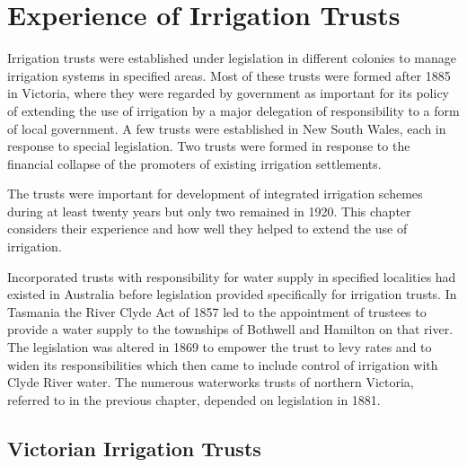 
\chapter{Experience of Irrigation Trusts}

\label{ch:trusts}

\setcounter{endnote}{0}

Irrigation trusts were established under legislation in different
colonies to manage irrigation systems in specified areas. Most of
these trusts were formed after 1885 in Victoria, where they were
regarded by government as important for its policy of extending the
use of irrigation by a major delegation of responsibility to a form of
local government.  A few trusts were established in New South Wales,
each in response to special legislation.  Two trusts were formed in
response to the financial collapse of the promoters of
existing irrigation settlements.

The trusts were important for development of integrated irrigation
schemes during at least twenty years but only two remained in 1920.
This chapter considers their experience and how well they helped to
extend the use of irrigation.

Incorporated trusts with responsibility for water supply in specified
localities had existed in Australia before legislation provided
specifically for irrigation trusts.  In Tasmania the River Clyde Act
 of 1857 led to the
appointment of trustees to provide a water supply to the townships of
Bothwell and Hamilton on that river.  The legislation was altered in
1869 to empower the trust to levy rates and to widen its
responsibilities which then came to include control of irrigation with
Clyde River  water.  The numerous waterworks trusts
of northern Victoria, referred to in the previous chapter, depended on
legislation in 1881.

\section*{Victorian Irrigation Trusts}

